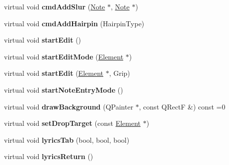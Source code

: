 \begin{DoxyCompactItemize}
virtual void {\bfseries cmd\+Add\+Slur} (\hyperlink{class_ms_1_1_note}{Note} $\ast$, \hyperlink{class_ms_1_1_note}{Note} $\ast$)
\item 
\mbox{\label{class_ms_1_1_muse_score_view_a087b492e090d7faad810323d3cd53926}} 
virtual void {\bfseries cmd\+Add\+Hairpin} (Hairpin\+Type)
\item 
\mbox{\label{class_ms_1_1_muse_score_view_adc3281dbef01cef080a91681ed0fab1e}} 
virtual void {\bfseries start\+Edit} ()
\item 
\mbox{\label{class_ms_1_1_muse_score_view_a1efb6db40e38cc3e998e67ccbce5f59b}} 
virtual void {\bfseries start\+Edit\+Mode} (\hyperlink{class_ms_1_1_element}{Element} $\ast$)
\item 
\mbox{\label{class_ms_1_1_muse_score_view_a3428a436f6584a39b92ea8f04032f156}} 
virtual void {\bfseries start\+Edit} (\hyperlink{class_ms_1_1_element}{Element} $\ast$, Grip)
\item 
\mbox{\label{class_ms_1_1_muse_score_view_af6a6ae5dc3d9b12328fa73c10f4a02b9}} 
virtual void {\bfseries start\+Note\+Entry\+Mode} ()
\item 
\mbox{\label{class_ms_1_1_muse_score_view_a6d7ac4e81d176a5ac38d59f0c4acdfda}} 
virtual void {\bfseries draw\+Background} (Q\+Painter $\ast$, const Q\+RectF \&) const =0
\item 
\mbox{\label{class_ms_1_1_muse_score_view_ae1c34dcfa9d21eeaea40a33ab92242eb}} 
virtual void {\bfseries set\+Drop\+Target} (const \hyperlink{class_ms_1_1_element}{Element} $\ast$)
\item 
\mbox{\label{class_ms_1_1_muse_score_view_aacd1260015f94ccef9e5b82377ca9d99}} 
virtual void {\bfseries lyrics\+Tab} (bool, bool, bool)
\item 
\mbox{\label{class_ms_1_1_muse_score_view_ae1226ce19c01e1e4082b2f91e399c1e5}} 
virtual void {\bfseries lyrics\+Return} ()
\item 

\end{DoxyCompactItemize}
